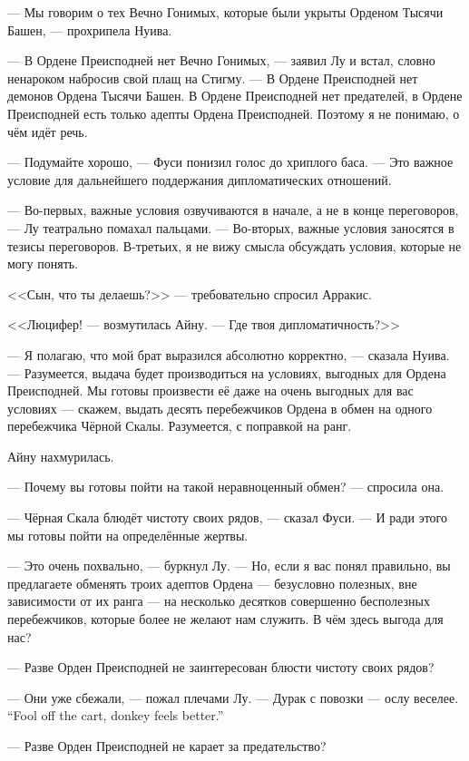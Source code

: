 --- Мы говорим о тех Вечно Гонимых, которые были укрыты Орденом Тысячи Башен, --- прохрипела Нуива.

--- В Ордене Преисподней нет Вечно Гонимых, --- заявил Лу и встал, словно ненароком набросив свой плащ на Стигму.
--- В Ордене Преисподней нет демонов Ордена Тысячи Башен.
В Ордене Преисподней нет предателей, в Ордене Преисподней есть только адепты Ордена Преисподней.
Поэтому я не понимаю, о чём идёт речь.

--- Подумайте хорошо, --- Фуси понизил голос до хриплого баса.
--- Это важное условие для дальнейшего поддержания дипломатических отношений.

--- Во-первых, важные условия озвучиваются в начале, а не в конце переговоров, --- Лу театрально помахал пальцами.
--- Во-вторых, важные условия заносятся в тезисы переговоров.
В-третьих, я не вижу смысла обсуждать условия, которые не могу понять.

<<Сын, что ты делаешь?>> --- требовательно спросил Арракис.

<<Люцифер! --- возмутилась Айну.
--- Где твоя дипломатичность?>>

--- Я полагаю, что мой брат выразился абсолютно корректно, --- сказала Нуива.
--- Разумеется, выдача будет производиться на условиях, выгодных для Ордена Преисподней.
Мы готовы произвести её даже на очень выгодных для вас условиях --- скажем, выдать десять перебежчиков Ордена в обмен на одного перебежчика Чёрной Скалы.
Разумеется, с поправкой на ранг.

Айну нахмурилась.

--- Почему вы готовы пойти на такой неравноценный обмен? --- спросила она.

--- Чёрная Скала блюдёт чистоту своих рядов, --- сказал Фуси.
--- И ради этого мы готовы пойти на определённые жертвы.

--- Это очень похвально, --- буркнул Лу.
--- Но, если я вас понял правильно, вы предлагаете обменять троих адептов Ордена --- безусловно полезных, вне зависимости от их ранга --- на несколько десятков совершенно бесполезных перебежчиков, которые более не желают нам служить.
В чём здесь выгода для нас?

--- Разве Орден Преисподней не заинтересован блюсти чистоту своих рядов?

--- Они уже сбежали, --- пожал плечами Лу.
{--- Дурак с повозки --- ослу веселее.}
{``Fool off the cart, donkey feels better.''}

--- Разве Орден Преисподней не карает за предательство?

